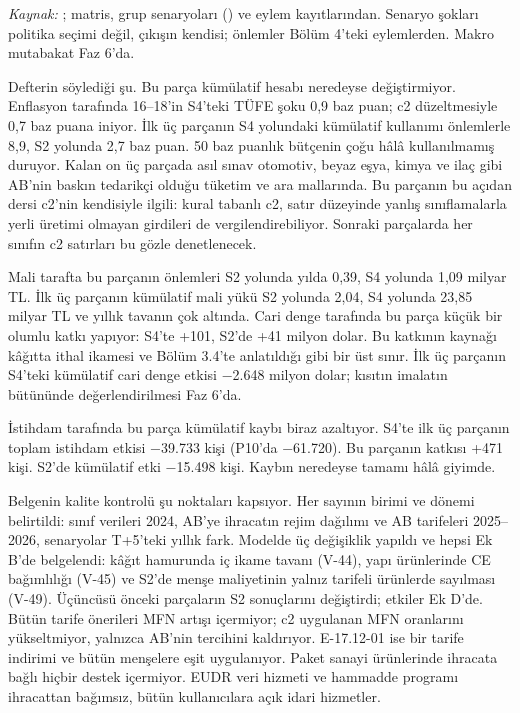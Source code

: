 \endgroup

\emph{Kaynak:} ; matris, grup senaryoları () ve eylem kayıtlarından. Senaryo şokları politika seçimi değil, çıkışın kendisi; önlemler Bölüm 4'teki eylemlerden. Makro mutabakat Faz 6'da.

Defterin söylediği şu. Bu parça kümülatif hesabı neredeyse değiştirmiyor. Enflasyon tarafında 16--18'in S4'teki TÜFE şoku 0,9 baz puan; c2 düzeltmesiyle 0,7 baz puana iniyor. İlk üç parçanın S4 yolundaki kümülatif kullanımı önlemlerle 8,9, S2 yolunda 2,7 baz puan. 50 baz puanlık bütçenin çoğu hâlâ kullanılmamış duruyor. Kalan on üç parçada asıl sınav otomotiv, beyaz eşya, kimya ve ilaç gibi AB'nin baskın tedarikçi olduğu tüketim ve ara mallarında. Bu parçanın bu açıdan dersi c2'nin kendisiyle ilgili: kural tabanlı c2, satır düzeyinde yanlış sınıflamalarla yerli üretimi olmayan girdileri de vergilendirebiliyor. Sonraki parçalarda her sınıfın c2 satırları bu gözle denetlenecek.

Mali tarafta bu parçanın önlemleri S2 yolunda yılda 0,39, S4 yolunda 1,09 milyar TL. İlk üç parçanın kümülatif mali yükü S2 yolunda 2,04, S4 yolunda 23,85 milyar TL ve yıllık tavanın çok altında. Cari denge tarafında bu parça küçük bir olumlu katkı yapıyor: S4'te +101, S2'de +41 milyon dolar. Bu katkının kaynağı kâğıtta ithal ikamesi ve Bölüm 3.4'te anlatıldığı gibi bir üst sınır. İlk üç parçanın S4'teki kümülatif cari denge etkisi −2.648 milyon dolar; kısıtın imalatın bütününde değerlendirilmesi Faz 6'da.

İstihdam tarafında bu parça kümülatif kaybı biraz azaltıyor. S4'te ilk üç parçanın toplam istihdam etkisi −39.733 kişi (P10'da −61.720). Bu parçanın katkısı +471 kişi. S2'de kümülatif etki −15.498 kişi. Kaybın neredeyse tamamı hâlâ giyimde.

Belgenin kalite kontrolü şu noktaları kapsıyor. Her sayının birimi ve dönemi belirtildi: sınıf verileri 2024, AB'ye ihracatın rejim dağılımı ve AB tarifeleri 2025--2026, senaryolar T+5'teki yıllık fark. Modelde üç değişiklik yapıldı ve hepsi Ek B'de belgelendi: kâğıt hamurunda iç ikame tavanı (V-44), yapı ürünlerinde CE bağımlılığı (V-45) ve S2'de menşe maliyetinin yalnız tarifeli ürünlerde sayılması (V-49). Üçüncüsü önceki parçaların S2 sonuçlarını değiştirdi; etkiler Ek D'de. Bütün tarife önerileri MFN artışı içermiyor; c2 uygulanan MFN oranlarını yükseltmiyor, yalnızca AB'nin tercihini kaldırıyor. E-17.12-01 ise bir tarife indirimi ve bütün menşelere eşit uygulanıyor. Paket sanayi ürünlerinde ihracata bağlı hiçbir destek içermiyor. EUDR veri hizmeti ve hammadde programı ihracattan bağımsız, bütün kullanıcılara açık idari hizmetler.

